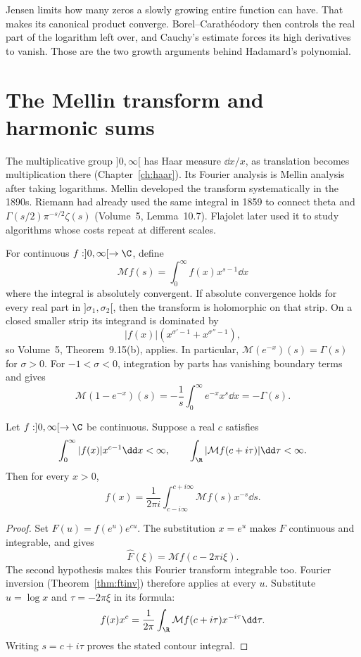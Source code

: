 \begin{beauty}
Jensen limits how many zeros a slowly growing entire function can have. That makes its canonical product converge. Borel--Carath\'eodory then controls the real part of the logarithm left over, and Cauchy's estimate forces its high derivatives to vanish. Those are the two growth arguments behind Hadamard's polynomial.
\end{beauty}
\section{The Mellin transform and harmonic sums}\label{sec:mellin}

The multiplicative group $]0,\infty[$ has Haar measure $\dd x/x$, as translation becomes multiplication there (Chapter~\ref{ch:haar}). Its Fourier analysis is Mellin analysis after taking logarithms. Mellin developed the transform systematically in the 1890s. Riemann had already used the same integral in 1859 to connect theta and $\Gamma(s/2)\pi^{-s/2}\zeta(s)$ (Volume~5, Lemma~10.7). Flajolet later used it to study algorithms whose costs repeat at different scales.

For continuous $f:]0,\infty[\to\C$, define
\[\mathcal Mf(s)=\int_0^\infty f(x)x^{s-1}\dd x\]
where the integral is absolutely convergent. If absolute convergence holds for every real part in $]\sigma_1,\sigma_2[$, then the transform is holomorphic on that strip. On a closed smaller strip its integrand is dominated by
\[|f(x)|(x^{\sigma'-1}+x^{\sigma''-1}),\]
so Volume~5, Theorem~9.15(b), applies. In particular, $\mathcal M(e^{-x})(s)=\Gamma(s)$ for $\sigma>0$. For $-1<\sigma<0$, integration by parts has vanishing boundary terms and gives
\begin{equation}\label{eq:mellin1me}
\mathcal M(1-e^{-x})(s)=-\frac1s\int_0^\infty e^{-x}x^s\dd x=-\Gamma(s).
\end{equation}

\begin{theorem}\label{thm:mellininv}
Let $f:]0,\infty[\to\C$ be continuous. Suppose a real $c$ satisfies
\[\int_0^\infty|f(x)|x^{c-1}\dd x<\infty,\qquad
\int_\R|\mathcal Mf(c+i\tau)|\dd\tau<\infty.
\]
Then for every $x>0$,
\[f(x)=\frac1{2\pi i}\int_{c-i\infty}^{c+i\infty}\mathcal Mf(s)x^{-s}\dd s.\]
\end{theorem}
\begin{proof}
Set $F(u)=f(e^u)e^{cu}$. The substitution $x=e^u$ makes $F$ continuous and integrable, and gives
\[\hat F(\xi)=\mathcal Mf(c-2\pi i\xi).\]
The second hypothesis makes this Fourier transform integrable too. Fourier inversion (Theorem~\ref{thm:ftinv}) therefore applies at every $u$. Substitute $u=\log x$ and $\tau=-2\pi\xi$ in its formula:
\[f(x)x^c=\frac1{2\pi}\int_\R\mathcal Mf(c+i\tau)x^{-i\tau}\dd\tau.
\]
Writing $s=c+i\tau$ proves the stated contour integral.
\end{proof}

